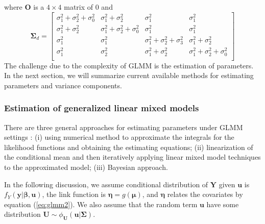 where $\bm O$ is a $4\times 4$ matrix of 0 and 
\[
\bm \Sigma_d = \left[
\begin{array}{cccc}
\sigma^2_1+ \sigma^2_2 + \sigma^2_0  & \sigma^2_1+\sigma^2_2 & \sigma^2_1 &\sigma^2_1\\
\sigma^2_1+\sigma^2_2 & \sigma^2_1 +\sigma^2_2 +\sigma^2_0 &\sigma^2_1 &\sigma^2_1\\
\sigma^2_1 & \sigma^2_1& \sigma^2_1+\sigma^2_2+\sigma^2_3 & \sigma^2_1 + \sigma^2_2\\
\sigma^2_1 &\sigma^2_2 &\sigma^2_1 +\sigma^2_2 & \sigma^2_1 +\sigma^2_2 +\sigma^2_0\\
\end{array}
\right]
\]
The challenge due to the complexity of GLMM is the estimation of parameters. In the next section,
we will summarize current available methods for estimating parameters and variance components.

\subsubsection{Estimation of generalized linear mixed models}\label{subsub:estimation}	
There are three general approaches for estimating parameters under GLMM settings \citep[Chapter
7]{myers2012generalized}: (i) using numerical method to approximate the integrals for the likelihood
functions and obtaining the estimating equations; (ii) linearization of the conditional mean and
then iteratively applying linear mixed model techniques to the approximated model; (iii) Bayesian
approach.  

In the following discussion, we assume conditional distribution of $\bm Y$ given $\bm u$ is
$f_{Y}(\bm y|\bm \beta, \bm u)$, the link function is $\bm \eta = g(\bm \mu)$, and $\bm \eta$
relates the covariates by equation (\ref{eq:glmm2}). We also assume that the random term $\bm u$ 
have some distribution $\bm U \sim \phi_{\bm U}(\bm u|\bm \Sigma)$. 	

